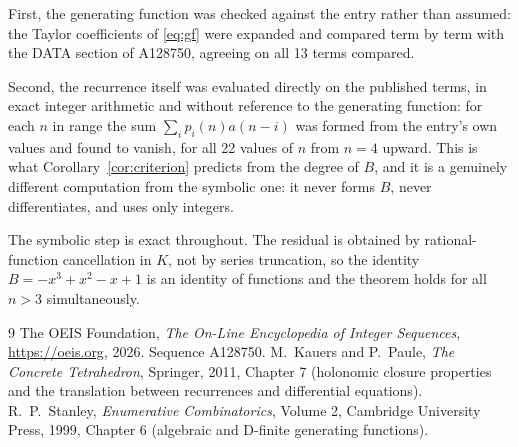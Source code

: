 \documentclass[11pt,a4paper]{article}
\theoremstyle{plain}
\theoremstyle{definition}
\begin{document}
First, the generating function was checked against the entry rather than assumed: the
Taylor coefficients of \eqref{eq:gf} were expanded and compared term by term with the DATA
section of A128750, agreeing on all 13 terms compared.

Second, the recurrence itself was evaluated directly on the published terms, in exact
integer arithmetic and without reference to the generating function: for each $n$ in range
the sum $\sum_{i}p_{i}(n)a(n-i)$ was formed from the entry's own values and found to
vanish, for all 22 values of $n$ from $n=4$ upward. This is what
Corollary~\ref{cor:criterion} predicts from the degree of $B$, and it is a genuinely
different computation from the symbolic one: it never forms $B$, never differentiates, and
uses only integers.

The symbolic step is exact throughout. The residual is obtained by rational-function
cancellation in $K$, not by series truncation, so the identity $B=- x^{3} + x^{2} - x + 1$ is an
identity of functions and the theorem holds for all $n>3$ simultaneously.

\begin{thebibliography}{9}
 The OEIS Foundation, \emph{The On-Line Encyclopedia of Integer Sequences},
\url{https://oeis.org}, 2026. Sequence A128750.
 M.~Kauers and P.~Paule, \emph{The Concrete Tetrahedron}, Springer, 2011,
Chapter 7 (holonomic closure properties and the translation between recurrences and
differential equations).
 R.~P.~Stanley, \emph{Enumerative Combinatorics}, Volume 2, Cambridge
University Press, 1999, Chapter 6 (algebraic and D-finite generating functions).
\end{thebibliography}
\end{document}

